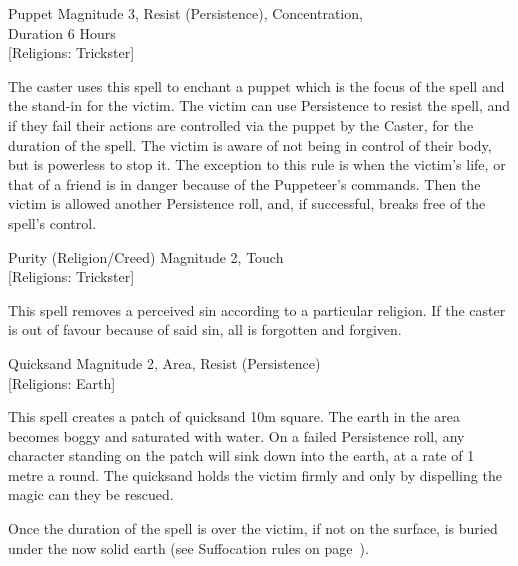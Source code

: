 \begin{rpg-spell}
{Puppet}
{Magnitude 3, Resist (Persistence), Concentration,\\Duration 6 Hours\\{[Religions: Trickster]}}

The caster uses this spell to enchant a puppet which is the focus of the spell and the stand-in for the victim. The victim can use Persistence to resist the spell, and if they fail their actions are controlled via the puppet by the Caster, for the duration of the spell. The victim is aware of not being in control of their body, but is powerless to stop it. The exception to this rule is when the victim’s life, or that of a friend is in danger because of the Puppeteer’s commands. Then the victim is allowed another Persistence roll, and, if successful, breaks free of the spell’s control.
\end{rpg-spell}

\begin{rpg-spell}
{Purity (Religion/Creed)}
{Magnitude 2, Touch\\{[Religions: Trickster]}}

This spell removes a perceived sin according to a particular religion. If the caster is out of favour because of said sin, all is forgotten and forgiven.
\end{rpg-spell}

\begin{rpg-spell}
{Quicksand}
{Magnitude 2, Area, Resist (Persistence)\\{[Religions: Earth]}}

This spell creates a patch of quicksand 10m square. The earth in the area becomes boggy and saturated with water. On a failed Persistence roll, any character standing on the patch will sink down into the earth, at a rate of 1 metre a round. The quicksand holds the victim firmly and only by dispelling the magic can they be rescued.

Once the duration of the spell is over the victim, if not on the surface, is buried under the now solid earth (see Suffocation rules on page~\pageref{ssec:suffocation}).
\end{rpg-spell}

